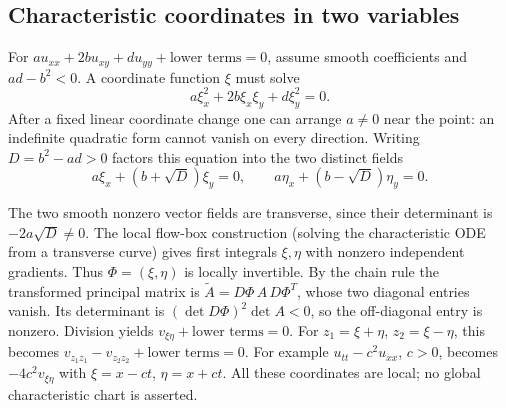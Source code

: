 \Needspace{55mm}
\subsection{Characteristic coordinates in two variables}
For $a u_{xx}+2b u_{xy}+d u_{yy}+\text{lower terms}=0$, assume smooth
coefficients and $ad-b^2<0$. A coordinate function $\xi$ must solve
\[
 a\xi_x^2+2b\xi_x\xi_y+d\xi_y^2=0.
\]
After a fixed linear coordinate change one can arrange $a\ne0$ near the
point: an indefinite quadratic form cannot vanish on every direction.
Writing $D=b^2-ad>0$ factors this equation into the two distinct fields
\[
 a\xi_x+(b+\sqrt D)\xi_y=0,\qquad
 a\eta_x+(b-\sqrt D)\eta_y=0.
\]
\begin{expandedproof}
The two smooth nonzero vector fields are transverse, since their determinant
is $-2a\sqrt D\ne0$. The local flow-box construction (solving the
characteristic ODE from a transverse curve) gives first integrals $\xi,\eta$
with nonzero independent gradients. Thus $\Phi=(\xi,\eta)$ is locally
invertible. By the chain rule the transformed principal matrix is
$\widetilde A=D\Phi\,A\,D\Phi^T$, whose two diagonal entries vanish.
Its determinant is $(\det D\Phi)^2\det A<0$, so the off-diagonal entry
is nonzero. Division yields $v_{\xi\eta}+\text{lower terms}=0$.
For $z_1=\xi+\eta$, $z_2=\xi-\eta$, this becomes
$v_{z_1z_1}-v_{z_2z_2}+\text{lower terms}=0$.
For example $u_{tt}-c^2u_{xx}$, $c>0$, becomes
$-4c^2v_{\xi\eta}$ with $\xi=x-ct$, $\eta=x+ct$.
All these coordinates are local; no global characteristic chart is asserted.
\end{expandedproof}
\Needspace{55mm}
